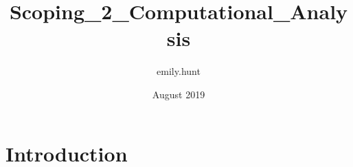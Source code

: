 \documentclass{article}
\title{Scoping_2_Computational_Analysis}
\author{emily.hunt }
\date{August 2019}
\begin{document}
\maketitle

\section{Introduction}
\end{document}
